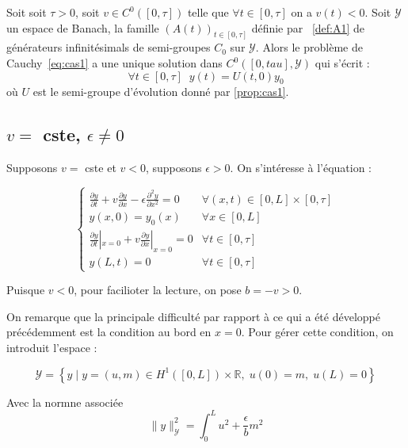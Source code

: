 \documentclass[a4paper]{article}
\newcommand{\dep}{b}
\begin{document}
\begin{theoreme}
	Soit soit $\tau>0$, soit $v \in C^0([0,\tau])$ telle que $\forall t \in [0,\tau]$ on a $v(t)<0$.
	Soit $\mathscr{Y}$ un espace de Banach, la famille $(A(t))_{t \in [0,\tau]}$ 
	définie par ~\eqref{def:A1}
	de générateurs infinitésimals de semi-groupes $C_0$ sur $\mathscr{Y}$.
	Alors le problème de Cauchy~\eqref{eq:cas1} a une unique solution dans $C^0([0,tau],\mathscr{Y})$ qui s'écrit :
	\[ \forall t\in[0,\tau] \; \; y(t) = U(t,0)y_0 \]
	où $U$ est le semi-groupe d'évolution donné par \ref{prop:cas1}.
\end{theoreme}

\subsection{$v =$ cste, $\epsilon \ne 0$}

Supposons $v=$ cste et $v<0$, supposons $\epsilon>0$. 
On s'intéresse à l'équation :


\begin{equation}
\label{eq:cas2}
\begin{cases}
 \displaystyle \frac{\partial y}{\partial t}
 + v \frac{\partial y} {\partial x}  
 - \epsilon \frac{\partial^2 y} {\partial x^2}
 = 0  & \forall (x,t) \in [0,L] \times [0, \tau]\\
 y(x,0) = y_{0} (x) & \forall x \in [0,L] \\
 \displaystyle \frac{\partial y}{\partial t}|_{x=0}
 + v \frac{\partial y} {\partial x}|_{x=0} = 0 & \forall t \in [0,\tau]\\
 y(L,t)=0 & \forall t \in [0,\tau]
\end{cases}
\end{equation}

Puisque $v<0$, pour facilioter la lecture, on pose $\dep = - v >0$.

On remarque que la principale difficulté par rapport à ce qui a été développé 
précédemment est la condition au bord en $x=0$.
Pour gérer cette condition, on introduit l'espace :

\[\mathscr{Y} = \left\{ y \; | \; y = (u,m) \in H^1([0,L])\times \mathbb{R},
 \; u(0)=m, \; u(L)=0 \right\} \]
 
 Avec la normne associée 
 \[\| y\|_{\mathscr{Y}}^2 = \int_0^L u^2 + \displaystyle \frac{\epsilon}{\dep} m^2 \]
\end{document}
